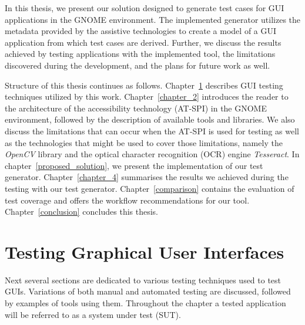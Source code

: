 In this thesis, we present our solution designed to generate test cases for GUI applications in the GNOME environment. The implemented generator utilizes the metadata provided by the assistive technologies to create a model of a GUI application from which test cases are derived. Further, we discuss the results achieved by testing applications with the implemented tool, the limitations discovered during the development, and the plans for future work as well.


Structure of this thesis continues as follows. Chapter~\ref{chapter_1} describes GUI testing techniques utilized by this work. Chapter~\ref{chapter_2} introduces the reader to the architecture of the accessibility technology (AT-SPI) in the GNOME environment, followed by the description of available tools and libraries. We also discuss the limitations that can occur when the AT-SPI is used for testing as well as the technologies that might be used to cover those limitations, namely the \textit{OpenCV} library and the optical character recognition (OCR) engine \textit{Tesseract}. In chapter~\ref{proposed_solution}, we present the implementation of our test generator. Chapter~\ref{chapter_4} summarises the results we achieved during the testing with our test generator. Chapter~\ref{comparison} contains the evaluation of test coverage and offers the workflow recommendations for our tool. Chapter~\ref{conclusion} concludes this thesis.

\chapter{Testing Graphical User Interfaces}\label{chapter_1}


Next several sections are dedicated to various testing techniques used to test GUIs. Variations of both manual and automated testing are discussed, followed by examples of tools using them. Throughout the chapter a tested application will be referred to as a system under test (SUT).

